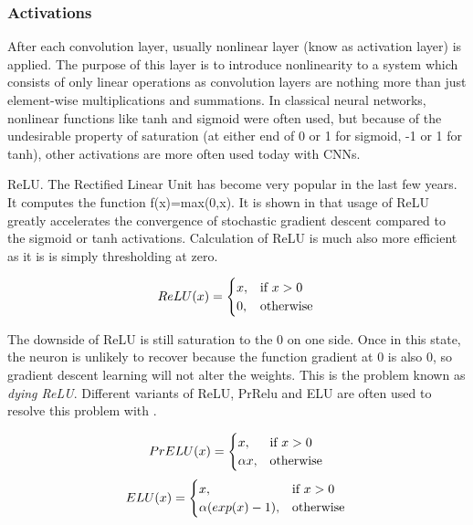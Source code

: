 \documentclass[times, utf8, diplomski, numeric, english]{fer}
\begin{document}
\subsubsection{Activations}
After each convolution layer, usually nonlinear layer (know as activation layer) is applied. The purpose of this layer is to introduce nonlinearity to a system which consists of only linear operations as convolution layers are nothing more than just element-wise multiplications and summations. In classical neural networks, nonlinear functions like tanh and sigmoid were often used, but because of the undesirable property of saturation (at either end of 0 or 1 for sigmoid, -1 or 1 for tanh), other activations are more often used today with CNNs. 

ReLU. The Rectified Linear Unit has become very popular in the last few years. It computes the function f(x)=max(0,x). It is shown in \cite{NIPS2012_4824} that usage of ReLU greatly accelerates the convergence of stochastic gradient descent compared to the sigmoid or tanh activations. Calculation of ReLU is much also more efficient as it is is simply thresholding at zero. 

\begin{equation}
ReLU(x) =
\begin{cases}
x, & \text{if}\ x>0 \\
0, & \text{otherwise}
\end{cases} \\
\end{equation}


The downside of ReLU is still saturation to the 0 on one side. Once in this state, the neuron is unlikely to recover because the function gradient at 0 is also 0, so gradient descent learning will not alter the weights. This is the problem known as \textit{dying ReLU}.
Different variants of ReLU, PrRelu and ELU are often used to resolve this problem\cite{prelu}\cite{elu} with .  

\begin{equation}    
PrELU(x)=
\begin{cases}
x, & \text{if}\ x>0 \\
\alpha x, & \text{otherwise}
\end{cases}\\
\end{equation}
\begin{equation}
ELU(x)=
\begin{cases}
x, & \text{if}\ x>0 \\
\alpha (exp(x) - 1), & \text{otherwise}
\end{cases}    \\
\end{equation}
\end{document}
